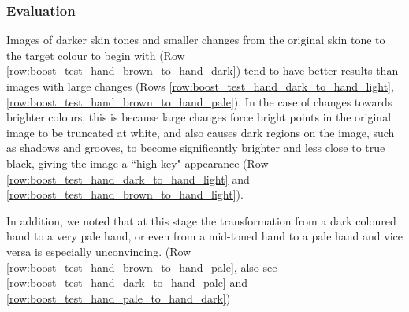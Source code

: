 \subsubsection*{Evaluation}
Images of darker skin tones and smaller changes from the original skin tone to the target colour to begin with (Row \ref{row:boost_test_hand_brown_to_hand_dark}) tend to have better results than images with large changes (Rows \ref{row:boost_test_hand_dark_to_hand_light}, \ref{row:boost_test_hand_brown_to_hand_pale}). In the case of changes towards brighter colours, this is because large changes force bright points in the original image to be truncated at white, and also causes dark regions on the image, such as shadows and grooves, to become significantly brighter and less close to true black, giving the image a ``high-key" appearance (Row \ref{row:boost_test_hand_dark_to_hand_light} and \ref{row:boost_test_hand_brown_to_hand_light}).

In addition, we noted that at this stage the transformation from a dark coloured hand to a very pale hand, or even from a mid-toned hand to a pale hand and vice versa is especially unconvincing. (Row \ref{row:boost_test_hand_brown_to_hand_pale}, also see \ref{row:boost_test_hand_dark_to_hand_pale} and \ref{row:boost_test_hand_pale_to_hand_dark})
